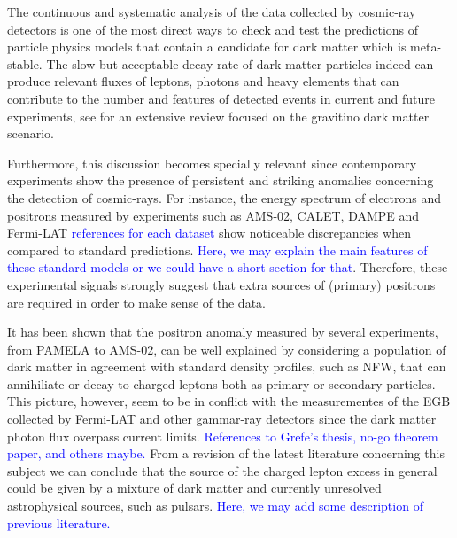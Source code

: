 \documentclass[a4paper,11pt]{article}
\newcommand*{\blue}{\textcolor{blue}}
\begin{document}
The continuous and systematic analysis of the data collected by cosmic-ray detectors is one of the most direct ways to check and test the predictions of particle physics models that contain a candidate for dark matter which is meta-stable. The slow but acceptable decay rate of dark matter particles indeed can produce relevant fluxes of leptons, photons and heavy elements that can contribute to the number and features of detected events in current and future experiments, see \cite{Grefe:2011dp} for an extensive review focused on the gravitino dark matter scenario. 

Furthermore, this discussion becomes specially relevant since contemporary experiments show the presence of persistent and striking anomalies concerning the detection of cosmic-rays. For instance, the energy spectrum of electrons and positrons measured by experiments such as AMS-02, CALET, DAMPE and Fermi-LAT \blue{references for each dataset} show noticeable discrepancies when compared to standard predictions. \blue{Here, we may explain the main features of these standard models or we could have a short section for that}. Therefore, these experimental signals strongly suggest that extra sources of (primary) positrons are required in order to make sense of the data. 

It has been shown that the positron anomaly measured by several experiments, from PAMELA to AMS-02, can be well explained by considering a population of dark matter in agreement with standard density profiles, such as NFW, that can annihiliate or decay to charged leptons
both as primary or secondary particles. This picture, however, seem to be in conflict with the measurementes of the EGB collected by Fermi-LAT
and other gammar-ray detectors since the dark matter photon flux overpass current limits. \blue{References to Grefe's thesis, no-go theorem paper, and others maybe.} From a revision of the latest literature concerning this subject we can conclude that the source of the charged lepton excess in general could be given by a mixture of dark matter and currently unresolved astrophysical sources, such as pulsars. \blue{Here, we may add some description of previous literature.}
\end{document}
